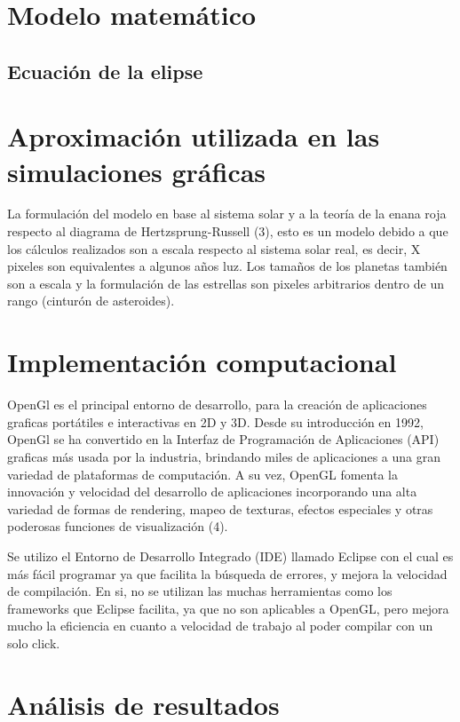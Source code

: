 \documentclass[journal]{IEEEtran}
\begin{document}
\section{Modelo matemático}

\subsection{Ecuación de la elipse}

\section{Aproximación utilizada en las simulaciones gráficas}

La formulación del modelo en base al sistema solar y a la teoría de la enana roja respecto al diagrama de Hertzsprung-Russell (3), esto es un modelo debido a que los cálculos realizados son a escala respecto al sistema solar real, es decir, X pixeles son equivalentes a algunos años luz. Los tamaños de los planetas también son a escala y la formulación de las estrellas son pixeles arbitrarios dentro de un rango (cinturón de asteroides).

\section{Implementación computacional}

OpenGl es el principal entorno de desarrollo, para la creación de aplicaciones graficas portátiles e interactivas en  2D y 3D. Desde su introducción en 1992, OpenGl se ha convertido en la Interfaz de Programación de Aplicaciones (API) graficas más usada por la industria, brindando miles de aplicaciones a una gran variedad de plataformas de computación. A su vez, OpenGL fomenta la innovación y velocidad del desarrollo de aplicaciones incorporando una alta variedad de formas de rendering, mapeo de texturas, efectos especiales y otras poderosas funciones de visualización  (4).

Se utilizo el Entorno de Desarrollo Integrado (IDE) llamado Eclipse con el cual es más fácil programar ya que facilita la búsqueda de errores, y mejora la velocidad de compilación. En si, no se utilizan las muchas herramientas como los frameworks que Eclipse facilita, ya que no son aplicables a OpenGL, pero mejora mucho la eficiencia en cuanto a velocidad de trabajo al poder compilar con un solo click.

\section{Análisis de resultados}
\end{document}
